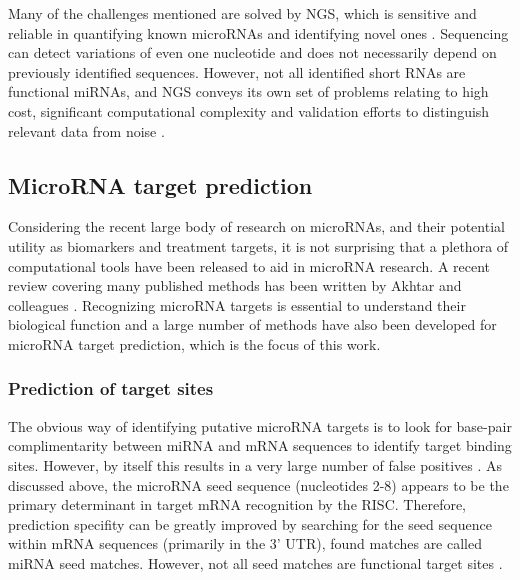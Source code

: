 Many of the challenges mentioned are solved by NGS, which is sensitive and
reliable in quantifying known microRNAs and identifying novel ones
\citep{Huang2011}. Sequencing can detect variations of even one nucleotide and
does not necessarily depend on previously identified sequences. However, not
all identified short RNAs are functional miRNAs, and NGS conveys its own set
of problems relating to high cost, significant computational complexity and
validation efforts to distinguish relevant data from noise
\citep{Chugh2012,Hunt2015}.







\subsection{MicroRNA target prediction}\label{mirna-target-prediction}


Considering the recent large body of research on microRNAs, and their
potential utility as biomarkers and treatment targets, it is not surprising
that a plethora of computational tools have been released to aid in microRNA
research. A recent review covering many published methods has been written by
Akhtar and colleagues \citep{Akhtar2016}. Recognizing microRNA targets is
essential to understand their biological function and a large number of
methods have also been developed for microRNA target prediction, which is the
focus of this work.



\subsubsection{Prediction of target sites}\label{sequence-based-target-
prediction}

The obvious way of identifying putative microRNA targets is to look for base-pair
complimentarity between miRNA and mRNA sequences to identify target
binding sites. However, by itself this results in a very large number of false
positives \citep{Bartel2009}. As discussed above, the microRNA seed sequence
(nucleotides 2-8) appears to be the primary determinant in target mRNA
recognition by the RISC. Therefore, prediction specifity can be greatly improved by
searching for the seed sequence within mRNA sequences (primarily in the 3'
UTR), found matches are called miRNA seed matches. However,
not all seed matches are functional target sites \citep{Grimson2007}.

